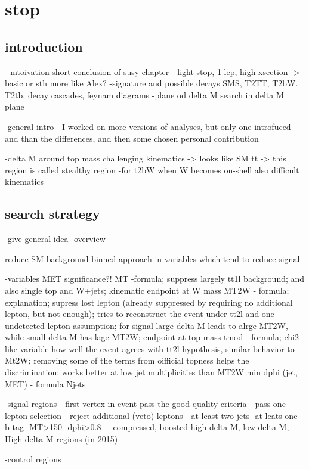 \chapter{stop}

\section{introduction}
- mtoivation
	short conclusion of susy chapter - light stop, 1-lep, high xsection -> basic or sth more like Alex?
-signature  and possible decays
	SMS, T2TT, T2bW. T2tb, decay cascades, feynam diagrams
-plane od delta M
	search in delta M plane

-general intro
	- I worked on more versions of analyses, but only one introfuced and than the differences, and then some chosen personal contribution

-delta M around top mass challenging kinematics -> looks like SM tt -> this region is called stealthy region
-for t2bW when W becomes on-shell also difficult kinematics

\section{search strategy}

-give general idea
	-overview

reduce SM background
binned approach in variables which tend to reduce signal

-variables
	MET significance?!
	MT -formula; suppress largely tt1l background; and also single top and W+jets; kinematic endpoint at W mass
	MT2W - formula; explanation; supress lost lepton (already suppressed by requiring no additional lepton, but not enough); tries to reconstruct the event under tt2l and one undetected lepton assumption; for signal large delta M leads to alrge MT2W, while small delta M has lage MT2W; endpoint at top mass
	tmod - formula; chi2 like variable how well the event agrees with tt2l hypothesis, similar behavior to Mt2W; removing some of the terms from oifficial topness helps the discrimination; works better at low jet multiplicities than MT2W
	min dphi (jet, MET) - formula
        Njets

-signal regions
	- first vertex in event pass the good quality criteria
	- pass one lepton selection
	- reject additional (veto) leptons
	- at least two jets
	-at leats one b-tag
	-MT>150
	-dphi>0.8
	+ compressed, boosted high delta M, low delta M, High delta M regions (in 2015)

-control regions

